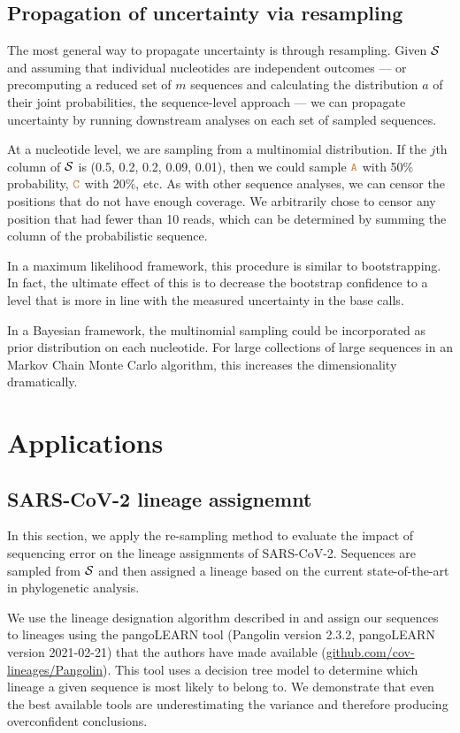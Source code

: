 \documentclass[10pt]{article}
\begin{document}
\subsection{Propagation of uncertainty via resampling}

The most general way to propagate uncertainty is through resampling.
Given $\mathcal{S}$ and assuming that individual nucleotides are independent outcomes --- or precomputing a reduced set of $m$ sequences and calculating the distribution $a$ of their joint probabilities, \ie the sequence-level approach --- we can propagate uncertainty by running downstream analyses on each set of sampled sequences.

At a nucleotide level, we are sampling from a multinomial distribution.
If the $j$th column of $\mathcal{S}$ is (0.5, 0.2, 0.2, 0.09, 0.01), then we could sample $\texttt{\textcolor{brown}{A}}$ with 50\% probability, $\texttt{\textcolor{brown}{C}}$ with 20\%, etc.
As with other sequence analyses, we can censor the positions that do not have enough coverage.
We arbitrarily chose to censor any position that had fewer than 10 reads, which can be determined by summing the column of the probabilistic sequence.

In a maximum likelihood framework, this procedure is similar to bootstrapping.
In fact, the ultimate effect of this is to decrease the bootstrap confidence to a level that is more in line with the measured uncertainty in the base calls.

In a Bayesian framework, the multinomial sampling could be incorporated as prior distribution on each nucleotide.
For large collections of large sequences in an Markov Chain Monte Carlo algorithm, this increases the dimensionality dramatically.


\section{Applications}

\subsection{SARS-CoV-2 lineage assignemnt}

In this section, we apply the re-sampling method to evaluate the impact of sequencing error on the lineage assignments of SARS-CoV-2.
Sequences are sampled from $\mathcal{S}$ and then assigned a lineage based on the current state-of-the-art in phylogenetic analysis.

We use the lineage designation algorithm described in \citet{rambautDynamicNomenclatureProposal2020} and assign our sequences to lineages using the pangoLEARN tool (Pangolin version 2.3.2, pangoLEARN version 2021-02-21) that the authors have made available (\url{github.com/cov-lineages/Pangolin}).
This tool uses a decision tree model to determine which lineage a given sequence is most likely to belong to.
We demonstrate that even the best available tools are underestimating the variance and therefore producing overconfident conclusions.
\end{document}
